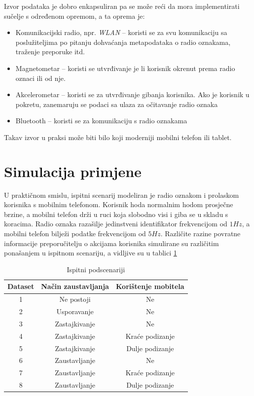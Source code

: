\documentclass[times, utf8, diplomski, numeric]{fer}
\begin{document}
Izvor podataka je dobro enkapsuliran pa se može reći da mora implementirati
sučelje s određenom opremom, a ta oprema je:
\begin{itemize}
  \item Komunikacijski radio, npr. \emph{WLAN}  -- koristi
  se za svu komunikaciju sa poslužiteljima po pitanju dohvaćanja metapodataka o
  radio oznakama, traženje preporuke itd.
  \item Magnetometar -- koristi se utvrđivanje je li korisnik okrenut prema
  radio oznaci ili od nje. %
  \item Akcelerometar -- koristi se za utvrđivanje gibanja korisnika. Ako je
  korisnik u pokretu, zanemaruju se podaci sa ulaza za očitavanje radio oznaka
  \item Bluetooth -- koristi se za komunikaciju s radio oznakama
\end{itemize}

Takav izvor u praksi može biti bilo koji moderniji mobilni telefon ili tablet.

\section{Simulacija primjene}
U praktičnom smislu, ispitni scenarij modeliran je radio oznakom i prolaskom
korisnika s mobilnim telefonom. Korisnik hoda normalnim hodom prosječne brzine,
a mobilni telefon drži u ruci koja slobodno visi i giba se u skladu s koracima.
Radio oznaka razašilje jedinstveni identifikator frekvencijom od $1 Hz$, a
mobilni telefon bilježi podatke frekvencijom od $5 Hz$. Različite razine
povratne informacije preporučitelju o akcijama korisnika simulirane su
različitim ponašanjem u ispitnom scenariju, a vidljive su u tablici
\ref{tbl:podscenariji}

\begin{table}[!htb]
	\caption{Ispitni podscenariji}
	\label{tbl:podscenariji}
	\centering
	\begin{tabular}{|c|c|c|} \hline		
		Dataset & Način zaustavljanja & Korištenje mobitela\\ \hline
		1 & Ne postoji & Ne\\
		2 & Usporavanje & Ne\\
		3 & Zastajkivanje & Ne\\
		4 & Zastajkivanje & Kraće podizanje\\
		5 & Zastajkivanje & Dulje podizanje\\
		6 & Zaustavljanje & Ne\\
		7 & Zaustavljanje & Kraće podizanje\\
		8 & Zaustavljanje & Dulje podizanje\\ \hline
	\end{tabular}
\end{table}
\end{document}
